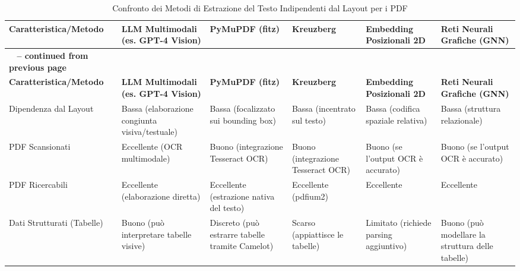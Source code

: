 \documentclass[a4paper, 11pt]{article}
\begin{document}
\begin{longtable}{>{\raggedright\arraybackslash}p{2.5cm} >{\raggedright\arraybackslash}p{2.2cm} >{\raggedright\arraybackslash}p{2.2cm} >{\raggedright\arraybackslash}p{2.2cm} >{\raggedright\arraybackslash}p{2.2cm} >{\raggedright\arraybackslash}p{2.2cm}}
\caption{Confronto dei Metodi di Estrazione del Testo Indipendenti dal Layout per i PDF}\\
\toprule
\textbf{Caratteristica/Metodo} & \textbf{LLM Multimodali (es. GPT-4 Vision)} & \textbf{PyMuPDF (fitz)} & \textbf{Kreuzberg} & \textbf{Embedding Posizionali 2D} & \textbf{Reti Neurali Grafiche (GNN)} \\
\midrule
\endfirsthead
\multicolumn{6}{c}%
{{\bfseries \tablename\ \thetable{} -- continued from previous page}} \\
\toprule
\textbf{Caratteristica/Metodo} & \textbf{LLM Multimodali (es. GPT-4 Vision)} & \textbf{PyMuPDF (fitz)} & \textbf{Kreuzberg} & \textbf{Embedding Posizionali 2D} & \textbf{Reti Neurali Grafiche (GNN)} \\
\midrule
\endhead
\bottomrule
\endfoot
Dipendenza dal Layout & Bassa (elaborazione congiunta visiva/testuale) \cite{problem_solved_layout_extraction} & Bassa (focalizzato sui bounding box) \cite{analytics_vidhya_pdf_extraction} & Bassa (incentrato sul testo) \cite{medium_kreuzberg} & Bassa (codifica spaziale relativa) \cite{docpolarbert} & Bassa (struttura relazionale) \cite{gnn_benchmarking} \\
\addlinespace
PDF Scansionati & Eccellente (OCR multimodale) \cite{problem_solved_layout_extraction} & Buono (integrazione Tesseract OCR) \cite{analytics_vidhya_pdf_extraction} & Buono (integrazione Tesseract OCR) \cite{medium_kreuzberg} & Buono (se l'output OCR è accurato) & Buono (se l'output OCR è accurato) \\
\addlinespace
PDF Ricercabili & Eccellente (elaborazione diretta) \cite{problem_solved_layout_extraction} & Eccellente (estrazione nativa del testo) \cite{analytics_vidhya_pdf_extraction} & Eccellente (pdfium2) \cite{medium_kreuzberg} & Eccellente & Eccellente \\
\addlinespace
Dati Strutturati (Tabelle) & Buono (può interpretare tabelle visive) \cite{problem_solved_layout_extraction} & Discreto (può estrarre tabelle tramite Camelot) \cite{analytics_vidhya_pdf_extraction} & Scarso (appiattisce le tabelle) \cite{medium_kreuzberg} & Limitato (richiede parsing aggiuntivo) & Buono (può modellare la struttura delle tabelle) \cite{survey_deep_learning_ocr} \\

\end{longtable}
\end{document}
